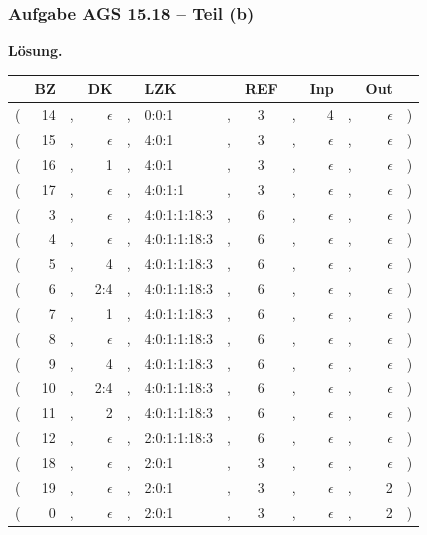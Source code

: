 \documentclass{beamer}
\newcommand*\head{\rowfont{\bfseries}}
\begin{document}
\begin{frame} \frametitle{Aufgabe AGS 15.18 -- Teil (b)}
	\footnotesize
	\textbf{Lösung.}
	\scriptsize
	\begin{center}
		\begin{tabu}{rrcrclcccrcrl}
			\head & BZ && DK && LZK && REF && Inp && Out & \\ \hline
			( & 14 &,& $\epsilon$ &,& 0:0:1 &,& 3 &,& 4 &,& $\epsilon$ & ) \\
			( & 15 &,& $\epsilon$ &,& 4:0:1 &,& 3 &,& $\epsilon$ &,& $\epsilon$ & ) \\
			( & 16 &,& 1 &,& 4:0:1 &,& 3 &,& $\epsilon$ &,& $\epsilon$ & ) \\
			( & 17 &,& $\epsilon$ &,& 4:0:1:1 &,& 3 &,& $\epsilon$ &,& $\epsilon$ & ) \\
			( & 3 &,& $\epsilon$ &,& 4:0:1:1:18:3 &,& 6 &,& $\epsilon$ &,& $\epsilon$ & ) \\
			( & 4 &,& $\epsilon$ &,& 4:0:1:1:18:3 &,& 6 &,& $\epsilon$ &,& $\epsilon$ & ) \\
			( & 5 &,& 4 &,& 4:0:1:1:18:3 &,& 6 &,& $\epsilon$ &,& $\epsilon$ & ) \\
			( & 6 &,& 2:4 &,& 4:0:1:1:18:3 &,& 6 &,& $\epsilon$ &,& $\epsilon$ & ) \\
			( & 7 &,& 1 &,& 4:0:1:1:18:3 &,& 6 &,& $\epsilon$ &,& $\epsilon$ & ) \\
			( & 8 &,& $\epsilon$ &,& 4:0:1:1:18:3 &,& 6 &,& $\epsilon$ &,& $\epsilon$ & ) \\
			( & 9 &,& 4 &,& 4:0:1:1:18:3 &,& 6 &,& $\epsilon$ &,& $\epsilon$ & ) \\
			( & 10 &,& 2:4 &,& 4:0:1:1:18:3 &,& 6 &,& $\epsilon$ &,& $\epsilon$ & ) \\
			( & 11 &,& 2 &,& 4:0:1:1:18:3 &,& 6 &,& $\epsilon$ &,& $\epsilon$ & ) \\
			( & 12 &,& $\epsilon$ &,& 2:0:1:1:18:3 &,& 6 &,& $\epsilon$ &,& $\epsilon$ & ) \\
			( & 18 &,& $\epsilon$ &,& 2:0:1 &,& 3 &,& $\epsilon$ &,& $\epsilon$ & ) \\
			( & 19 &,& $\epsilon$ &,& 2:0:1 &,& 3 &,& $\epsilon$ &,& 2 & ) \\
			( & 0 &,& $\epsilon$ &,& 2:0:1 &,& 3 &,& $\epsilon$ &,& 2 & ) \\
		\end{tabu}
	\end{center}
\end{frame}
\end{document}
